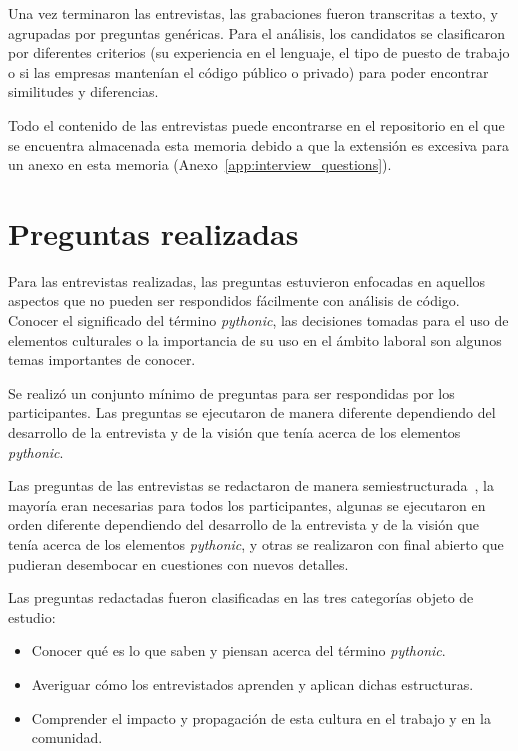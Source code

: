 \documentclass[a4paper, 12pt]{book}
\begin{document}
Una vez terminaron las entrevistas, las grabaciones fueron transcritas a texto, y agrupadas por preguntas genéricas. Para el análisis, los candidatos se clasificaron por diferentes criterios (su experiencia en el lenguaje, el tipo de puesto de trabajo o si las empresas mantenían el código público o privado) para poder encontrar similitudes y diferencias.

Todo el contenido de las entrevistas puede encontrarse en el repositorio en el que se encuentra almacenada esta memoria debido a que la extensión es excesiva para un anexo en esta memoria (Anexo~\ref{app:interview_questions}).


\section{Preguntas realizadas}

Para las entrevistas realizadas, las preguntas estuvieron enfocadas en aquellos aspectos que no pueden ser respondidos fácilmente con análisis de código. Conocer el significado del término \textit{pythonic}, las decisiones tomadas para el uso de elementos culturales o la importancia de su uso en el ámbito laboral son algunos temas importantes de conocer.

Se realizó un conjunto mínimo de preguntas para ser respondidas por los participantes. Las preguntas se ejecutaron de manera diferente dependiendo del desarrollo de la entrevista y de la visión que tenía acerca de los elementos \textit{pythonic}.

Las preguntas de las entrevistas se redactaron de manera semiestructurada~\cite{merriam2009qualitative}, la mayoría eran necesarias para todos los participantes, algunas se ejecutaron en orden diferente dependiendo del desarrollo de la entrevista y de la visión que tenía acerca de los elementos \textit{pythonic}, y otras se realizaron con final abierto que pudieran desembocar en cuestiones con nuevos detalles.

Las preguntas redactadas fueron clasificadas en las tres categorías objeto de estudio:
\begin{itemize}
    \item Conocer qué es lo que saben y piensan acerca del término \textit{pythonic}. 

    \item Averiguar cómo los entrevistados aprenden y aplican dichas estructuras.
    
    \item Comprender el impacto y propagación de esta cultura en el trabajo y en la comunidad.
\end{itemize}
\end{document}
